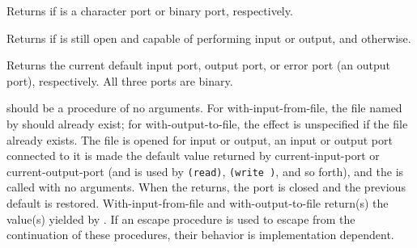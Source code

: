 \begin{entry}{%
}

Returns \schtrue{} if  is a character port or binary port,
respectively.
\end{entry}


\begin{entry}{%
}

Returns \schtrue{} if  is still open and capable of
performing input or output, and \schfalse otherwise.


\end{entry}


\begin{entry}{%
}
 
Returns the current default input port, output port, or error port (an
output port), respectively.  All three ports are binary.

\end{entry}


\begin{entry}{%
}

 should be a procedure of no arguments.
For {\cf with-input-from-file},
the file named by  should already exist; for
{\cf with-output-to-file},
the effect is unspecified if the file
already exists.
The file is opened for input or output, an input or output port
connected to it is made the default value returned by
{\cf current-input-port} or {\cf current-output-port}
(and is used by {\tt (read)}, {\tt (write )}, and so forth),
and the
 is called with no arguments.  When the  returns,
the port is closed and the previous default is restored.
{\cf With-input-from-file} and {\cf with-output-to-file} return(s) the
value(s) yielded by .
If an escape procedure
is used to escape from the continuation of these procedures, their
behavior is implementation dependent.




\end{entry}


